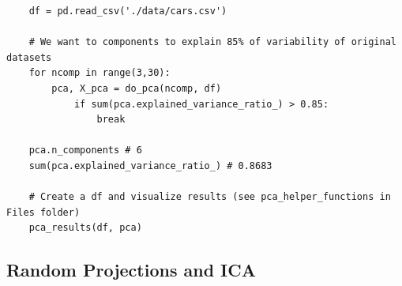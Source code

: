 \documentclass[11pt, a4paper]{article}
\begin{document}
\begin{spacing}{1.1}
	\begin{lstlisting}
	df = pd.read_csv('./data/cars.csv')
	
	# We want to components to explain 85% of variability of original datasets
	for ncomp in range(3,30):
		pca, X_pca = do_pca(ncomp, df)
			if sum(pca.explained_variance_ratio_) > 0.85:
				break
	
	pca.n_components # 6
	sum(pca.explained_variance_ratio_) # 0.8683
	
	# Create a df and visualize results (see pca_helper_functions in Files folder)
	pca_results(df, pca)
	\end{lstlisting} \vspace*{2mm}
	
	\subsection{Random Projections and ICA}
	

	
	
	
	
	
	
\end{spacing}
\end{document}
